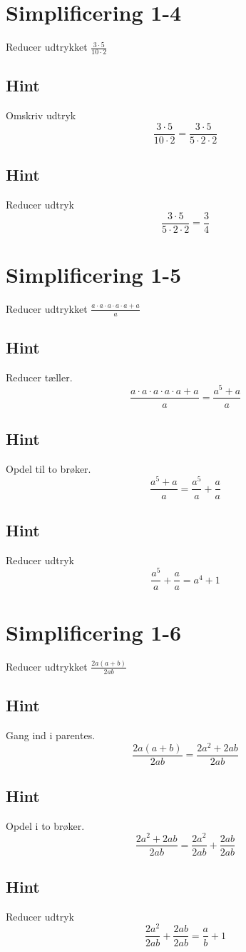 \documentclass{article}
\newenvironment{exercise}[1]{\newpage\section{#1}}{}
\newcommand{\answerbox}[1]{\fbox{$#1$}}
\newcommand{\hint}{\subsection*{Hint}}
\begin{document}
\newpage

\begin{exercise}{Simplificering 1-4}
	
	Reducer udtrykket $\frac{3 \cdot 5}{10 \cdot 2}$
	
	\answerbox{\frac{3}{4}}
	
	\hint
	
	Omskriv udtryk
	\[
	\frac{3 \cdot 5}{10 \cdot 2} =  \frac{3 \cdot 5}{5 \cdot 2 \cdot 2}
	\]
	
	\hint
	
	Reducer udtryk
	\[
	\frac{3 \cdot 5}{5 \cdot 2 \cdot 2} = \frac{3}{4}
	\]
	

	
\end{exercise}

\newpage

\begin{exercise}{Simplificering 1-5}
	
	Reducer udtrykket $\frac{a \cdot a \cdot a \cdot a \cdot a + a}{a}$
	
	\answerbox{a^4 + 1}
	
	\hint
	
	Reducer tæller.
	\[
	\frac{a \cdot a \cdot a \cdot a \cdot a + a}{a}  = \frac{a^5+a}{a}
	\]
	
	\hint 
	
	Opdel  til to brøker.
	\[
	\frac{a^5+a}{a} = \frac{a^5}{a} + \frac{a}{a}
	\]
	
	\hint
	
	Reducer udtryk 
	\[
	 \frac{a^5}{a} + \frac{a}{a} = a^4 + 1
	\]
		
\end{exercise}

\newpage

\begin{exercise}{Simplificering 1-6}
	
	Reducer udtrykket $\frac{2a(a+b)}{2ab}$
	
	\answerbox{\frac{a}{b} + 1}
	
	\hint
	
	Gang ind i parentes.
	\[
	\frac{2a(a+b)}{2ab} = \frac{2a^2 + 2ab}{2ab}
	\]
	
	\hint
	
	Opdel i to brøker.
	\[
	 \frac{2a^2 + 2ab}{2ab} = \frac{2a^2}{2ab} + \frac{2ab}{2ab}
	\]
	
	
	\hint
	
	Reducer udtryk 
	\[
	\frac{2a^2}{2ab} + \frac{2ab}{2ab} = \frac{a}{b} + 1
	\]
	
\end{exercise}
\end{document}
